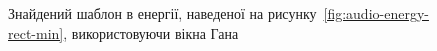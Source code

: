 \begin{figure}[h]

            \caption{Знайдений шаблон в енергії, наведеної на рисунку~\ref{fig:audio-energy-rect-min},
                використовуючи вікна Гана}
            \label{fig:matched-energy-rect-min-hann}
        \end{figure}

